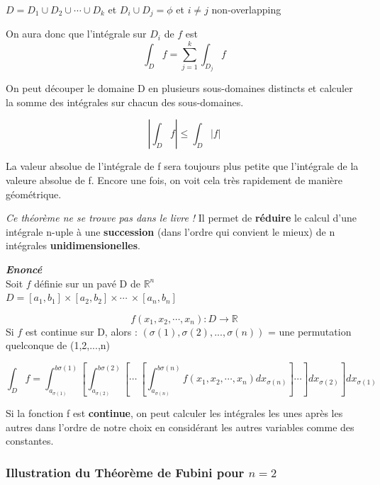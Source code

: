 \begin{myprop}
$D= D_1 \cup D_2 \cup \cdots \cup D_k$ et $D_i \cup D_j = \phi$ et $i\neq j$ non-overlapping

On aura donc que l'intégrale sur $D_i$ de $f$ est
\[\int_D f=\sum_{j=1}^k \int_{D_j} f\]

On peut découper le domaine D en plusieurs sous-domaines distincts et calculer la somme des intégrales sur chacun des sous-domaines.
\end{myprop}

\begin{myprop}
\[\left|\int_D f \right| \le \int_D|f|\]

La valeur absolue de l'intégrale de f sera toujours plus petite que l'intégrale de la valeure absolue de f. Encore une fois, on voit cela très rapidement de manière géométrique.
\end{myprop}

\begin{myprop}
\textit{Ce théorème ne se trouve pas dans le livre !}
Il permet de \textbf{réduire} le calcul d'une intégrale n-uple à une \textbf{succession} (dans l'ordre qui convient le mieux) de n intégrales \textbf{unidimensionelles}.

\textit{\textbf{Enoncé}} \\Soit $f$ définie sur un pavé D de $\mathbb{R}^n$\\
$D=[a_1,b_1]\times[a_2,b_2]\times \cdots\ \times[a_n,b_n]$

\[f(x_1,x_2,\cdots,x_n) : D\to\mathbb{R}\]
Si $f$ est continue sur D, alors : $(\sigma(1),\sigma(2),...,\sigma(n)) $ = une permutation quelconque de (1,2,...,n)

$$
\int_D f= \int_{a_{\sigma(1)}}^{b{\sigma(1)}}
\left[
\int_{a_{\sigma(2)}}^{b{\sigma(2)}}
\left[ \cdots\ \left[
\int_{a_{\sigma(n)}}^{b{\sigma(n)}}
f(x_1,x_2,\cdots,x_n )dx_{\sigma(n)}
\right]\cdots\right]
dx_{\sigma(2)} \right] dx_{\sigma(1)}
$$

Si la fonction f est \textbf{continue}, on peut calculer les intégrales les unes après les autres dans l'ordre de notre choix en considérant les autres variables comme des constantes.
\end{myprop}




\subsubsection{Illustration du Théorème de Fubini pour $n=2$}




